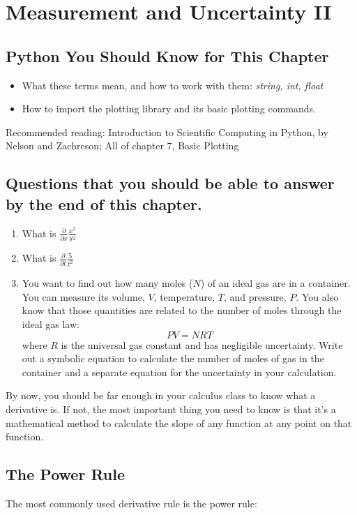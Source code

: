 \documentclass[twoside,11pt,ShortChapTitles]{BYUTextbook}
\begin{document}
\chapter{Measurement and Uncertainty II}
\section*{Python You Should Know for This Chapter}
\begin{itemize}
\item What these terms mean, and how to work with them: {\em string, int, float}
\item How to import the  plotting library and its basic plotting commands.
\end{itemize}
Recommended reading: Introduction to Scientific Computing in Python, by Nelson and Zachreson; All of chapter 7, Basic Plotting
\section*{Questions that you should be able to answer by the end of this chapter.}
\begin{enumerate}
\item What is $\frac{\partial}{\partial x} \frac{x^2}{yz}$
\item What is $\frac{\partial}{\partial t} \frac{5}{t^2}$
\item You want to find out how many moles ($N$) of an ideal gas are in a container.  You can measure its volume, $V$, temperature, $T$, and pressure, $P$.  You also know that those quantities are related to the number of moles through the ideal gas law:
\[PV=NRT\]
where $R$ is the universal gas constant and has negligible uncertainty.  Write out a symbolic equation to calculate the number of moles of gas in the container and a separate equation for the uncertainty in your calculation.
\end{enumerate}
\hrulefill


By now, you should be far enough in your calculus class to know what a derivative is.  If not, the most important thing you need to know is that it's a mathematical method to calculate the slope of any function at any point on that function.

\section{The Power Rule}
The most commonly used derivative rule is the power rule:
\end{document}
